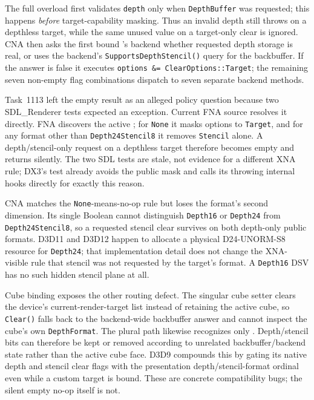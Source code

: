 The full overload first validates \texttt{depth} only when \texttt{DepthBuffer} was requested;
this happens \emph{before} target-capability masking. Thus an invalid depth still throws on a
depthless target, while the same unused value on a target-only clear is ignored. CNA then asks
the first bound 's backend whether requested depth storage is real, or
uses the backend's \texttt{SupportsDepthStencil()} query for the backbuffer. If the answer is
false it executes \texttt{options \&= ClearOptions::Target}; the remaining seven non-empty flag
combinations dispatch to seven separate backend methods.

Task~1113 left the empty result as an alleged policy question because two SDL\_Renderer tests
expected an exception. Current FNA source resolves it directly. FNA discovers the active
; for \texttt{None} it masks options to \texttt{Target}, and for any
format other than \texttt{Depth24Stencil8} it removes \texttt{Stencil} alone. A
depth/stencil-only request on a depthless target therefore becomes empty and returns silently.
The two SDL tests are stale, not evidence for a different XNA rule; DX3's test already avoids
the public mask and calls its throwing internal hooks directly for exactly this reason.

CNA matches the \texttt{None}-means-no-op rule but loses the format's second dimension. Its
single Boolean cannot distinguish \texttt{Depth16} or \texttt{Depth24} from
\texttt{Depth24Stencil8}, so a requested stencil clear survives on both depth-only public
formats. D3D11 and D3D12 happen to allocate a physical D24-UNORM-S8 resource for
\texttt{Depth24}; that implementation
detail does not change the XNA-visible rule that stencil was not requested by the target's
format. A \texttt{Depth16} DSV has no such hidden stencil plane at all.

Cube binding exposes the other routing defect. The singular cube setter clears the device's
current-render-target list instead of retaining the active cube, so \texttt{Clear()} falls
back to the backend-wide backbuffer answer and cannot inspect the cube's own
\texttt{DepthFormat}. The plural path likewise recognizes only .
Depth/stencil bits can therefore be kept or removed according to unrelated backbuffer/backend
state rather than the active cube face. D3D9 compounds this by gating its native depth and
stencil clear flags with the presentation depth/stencil-format ordinal even while a custom
target is bound. These are concrete
compatibility bugs; the silent empty no-op itself is not.

